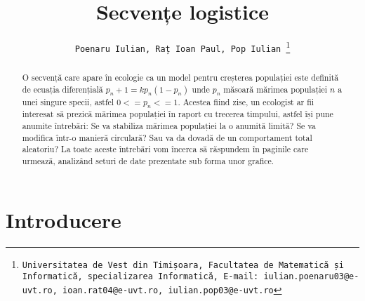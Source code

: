 \documentclass[a4paper,12pt]{article}
\title{\bf Secvențe logistice}
\author{\tt Poenaru Iulian, Raț Ioan Paul, Pop Iulian \thanks{Universitatea de Vest din Timișoara, Facultatea de Matematică și Informatică, specializarea Informatică, E-mail: iulian.poenaru03@e-uvt.ro, ioan.rat04@e-uvt.ro, iulian.pop03@e-uvt.ro}}
\date{}
\begin{document}
\maketitle

\begin{abstract}
O secvență care apare în ecologie ca un model pentru creșterea populației este definită de ecuația diferențială $p_n+1 = kp_n(1-p_n)$ unde $p_n$ măsoară mărimea populației $n$ a unei singure specii, astfel $0<=p_n<=1$. Acestea fiind zise, un ecologist ar fii interesat să prezică mărimea populației în raport cu trecerea timpului, astfel își pune anumite întrebări: Se va stabiliza mărimea populației la o anumită limită? Se va modifica într-o manieră circulară? Sau va da dovadă de un comportament total aleatoriu? La toate aceste întrebări vom încerca să răspundem în paginile care urmează, analizând seturi de date prezentate sub forma unor grafice.
\end{abstract}

\section{Introducere}
\end{document}
